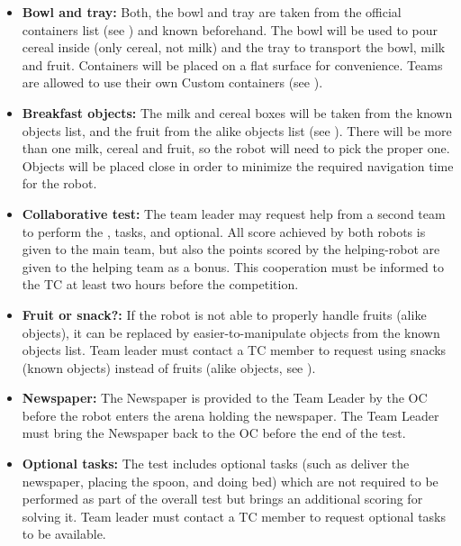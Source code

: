 \begin{itemize}
	\item \textbf{Bowl and tray:} Both, the bowl and tray are taken from the official containers list (see ) and known beforehand. The bowl will be used to pour cereal inside (only cereal, not milk) and the tray to transport the bowl, milk and fruit. Containers will be placed on a flat surface for convenience. Teams are allowed to use their own Custom containers (see ).

	\item \textbf{Breakfast objects:} The milk and cereal boxes will be taken from the known objects list, and the fruit from the alike objects list (see ). There will be more than one milk, cereal and fruit, so the robot will need to pick the proper one. Objects will be placed close in order to minimize the required navigation time for the robot.

	\item \textbf{Collaborative test:} The team leader may request help from a second team to perform the ,  tasks, and  optional. All score achieved by both robots is given to the main team, but also the points scored by the helping-robot are given to the helping team as a bonus. This cooperation must be informed to the TC at least two hours before the competition.

	\item \textbf{Fruit or snack?:} If the robot is not able to properly handle fruits (alike objects), it can be replaced by easier-to-manipulate objects from the known objects list. Team leader must contact a TC member to request using snacks (known objects) instead of fruits (alike objects, see ).

	\item \textbf{Newspaper:} The Newspaper is provided to the Team Leader by the OC before the robot enters the arena holding the newspaper. The Team Leader must bring the Newspaper back to the OC before the end of the test.

	\item \textbf{Optional tasks:} The test includes optional tasks (such as deliver the newspaper, placing the spoon, and doing bed) which are not required to be performed as part of the overall test but brings an additional scoring for solving it. Team leader must contact a TC member to request optional tasks to be available.


\end{itemize}
